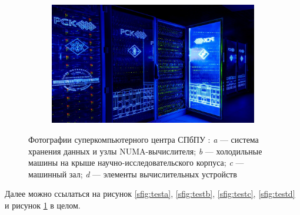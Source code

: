 \begin{refsection}
\begin{figure}[ht]
\begin{subfigure}[t]{\dimexpr.5\linewidth-1.3em\relax}
\end{subfigure}%
\hfill %
%
\begin{subfigure}[t]{\dimexpr.5\linewidth-1.3em\relax}
	\centering
	\includegraphics[width=.95\linewidth,valign=t]{my_folder/images/spbpu_sc_box}
\end{subfigure}
\captionsetup{justification=centering} %
\caption{Фотографии суперкомпьютерного центра СПбПУ \cite{spbpu_site}: {\itshape a} --- система хранения данных и узлы NUMA-вычислителя; {\itshape b} --- холодильные машины на крыше научно-исследовательского корпуса; {\itshape c} --- машинный зал; {\itshape d} --- элементы вычислительных устройств} 
\label{Fig:complexABCD}
\end{figure}

Далее можно ссылаться на рисунок \ref{sfig:testa}, \ref{sfig:testb}, \ref{sfig:testc}, \ref{sfig:testd} и рисунок \ref{Fig:complexABCD} в целом.




\end{refsection}
